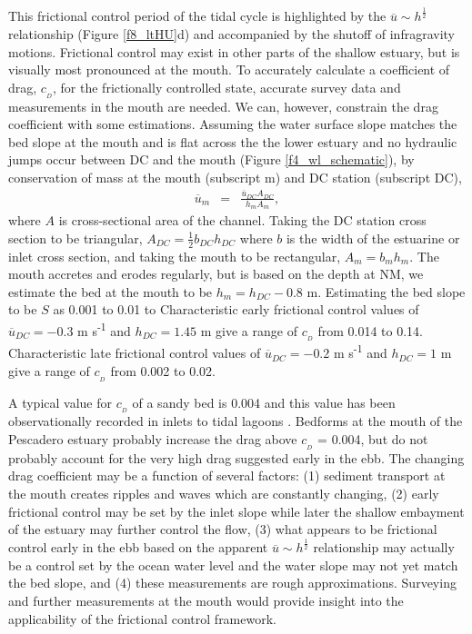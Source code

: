 This frictional control period of the tidal cycle is highlighted by
the $\overline{u}\sim h^{\frac{1}{2}}$ relationship (Figure \ref{f8_ltHU}d)
and accompanied by the shutoff of infragravity motions. Frictional
control may exist in other parts of the shallow estuary, but is visually
most pronounced at the mouth. To accurately calculate a coefficient
of drag, $c_{_D}$, for the frictionally controlled state, accurate
survey data and measurements in the mouth are needed. We can, however,
constrain the drag coefficient with some estimations. Assuming the
water surface slope matches the bed slope at the mouth and is flat
across the the lower estuary and no hydraulic jumps occur between
DC and the mouth (Figure \ref{f4_wl_schematic}), by conservation
of mass at the mouth (subscript m) and DC station (subscript DC),
\begin{eqnarray}
\overline{u}_{m} & = & \frac{\overline{u}_{DC}A_{DC}}{h_{m}A_{m}},\label{eq:consmass_udc_um}
\end{eqnarray}
where $A\mbox{}$ is cross-sectional area of the channel. Taking the
DC station cross section to be triangular, $A_{DC}=\frac{1}{2}b_{DC}h_{DC}$
where \textbf{$b\mbox{}$} is the width of the estuarine or inlet
cross section, and taking the mouth to be rectangular, $A_{m}=b_{m}h_{m}$.\emph{
}The mouth accretes and erodes regularly, but is based on the depth
at NM, we estimate the bed at the mouth to be $h_{m}=h_{DC}-0.8$
m. Estimating the bed slope to be $S$ as 0.001 to 0.01 to Characteristic
early frictional control values of $\overline{{u}}{}_{DC}=-0.3$ m
s\textsuperscript{-1} and $h_{DC}=1.45$ m give a range of $c_{_D}$
from 0.014 to 0.14. Characteristic late frictional control values
of $\overline{{u}}{}_{DC}=-0.2$ m s\textsuperscript{-1} and $h_{DC}=1$
m give a range of $c_{_D}$ from 0.002 to 0.02.

A typical value for $c_{_D}$ of a sandy bed is 0.004 \parencite{soulsby_bottom_1983}
and this value has been observationally recorded in inlets to tidal
lagoons \parencite{rydberg_tidal_1996}. Bedforms at the mouth of
the Pescadero estuary probably increase the drag above $c_{_D}$ =
0.004, but do not probably account for the very high drag suggested
early in the ebb. The changing drag coefficient may be a function
of several factors: (1) sediment transport at the mouth creates ripples
and waves which are constantly changing, (2) early frictional control
may be set by the inlet slope while later the shallow embayment of
the estuary may further control the flow, (3) what appears to be frictional
control early in the ebb based on the apparent $\overline{u}\sim h^{\frac{1}{2}}$
relationship may actually be a control set by the ocean water level
and the water slope may not yet match the bed slope, and (4) these
measurements are rough approximations. Surveying and further measurements
at the mouth would provide insight into the applicability of the frictional
control framework. 

